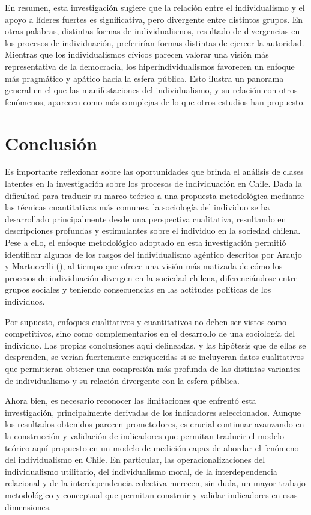 \documentclass[
  letterpaper,
  DIV=11,
  numbers=noendperiod]{scrartcl}
\begin{document}
En resumen, esta investigación sugiere que la relación entre el
individualismo y el apoyo a líderes fuertes es significativa, pero
divergente entre distintos grupos. En otras palabras, distintas formas
de individualismos, resultado de divergencias en los procesos de
individuación, preferirían formas distintas de ejercer la autoridad.
Mientras que los individualismos cívicos parecen valorar una visión más
representativa de la democracia, los hiperindividualismos favorecen un
enfoque más pragmático y apático hacia la esfera pública. Esto ilustra
un panorama general en el que las manifestaciones del individualismo, y
su relación con otros fenómenos, aparecen como más complejas de lo que
otros estudios han propuesto.

\section*{Conclusión}\label{conclusiuxf3n}

Es importante reflexionar sobre las oportunidades que brinda el análisis
de clases latentes en la investigación sobre los procesos de
individuación en Chile. Dada la dificultad para traducir su marco
teórico a una propuesta metodológica mediante las técnicas cuantitativas
más comunes, la sociología del individuo se ha desarrollado
principalmente desde una perspectiva cualitativa, resultando en
descripciones profundas y estimulantes sobre el individuo en la sociedad
chilena. Pese a ello, el enfoque metodológico adoptado en esta
investigación permitió identificar algunos de los rasgos del
individualismo agéntico descritos por Araujo y Martuccelli
(), al tiempo que ofrece una visión más
matizada de cómo los procesos de individuación divergen en la sociedad
chilena, diferenciándose entre grupos sociales y teniendo consecuencias
en las actitudes políticas de los individuos.

Por supuesto, enfoques cualitativos y cuantitativos no deben ser vistos
como competitivos, sino como complementarios en el desarrollo de una
sociología del individuo. Las propias conclusiones aquí delineadas, y
las hipótesis que de ellas se desprenden, se verían fuertemente
enriquecidas si se incluyeran datos cualitativos que permitieran obtener
una compresión más profunda de las distintas variantes de individualismo
y su relación divergente con la esfera pública.

Ahora bien, es necesario reconocer las limitaciones que enfrentó esta
investigación, principalmente derivadas de los indicadores
seleccionados. Aunque los resultados obtenidos parecen prometedores, es
crucial continuar avanzando en la construcción y validación de
indicadores que permitan traducir el modelo teórico aquí propuesto en un
modelo de medición capaz de abordar el fenómeno del individualismo en
Chile. En particular, las operacionalizaciones del individualismo
utilitario, del individualismo moral, de la interdependencia relacional
y de la interdependencia colectiva merecen, sin duda, un mayor trabajo
metodológico y conceptual que permitan construir y validar indicadores
en esas dimensiones.
\end{document}

